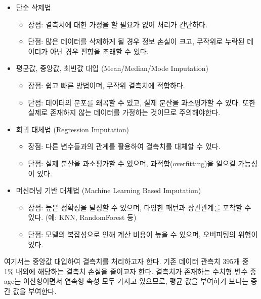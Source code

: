 \documentclass[
  letterpaper,
  DIV=11,
  numbers=noendperiod]{scrreprt}
\providecommand{\tightlist}{%
  \setlength{\itemsep}{0pt}\setlength{\parskip}{0pt}}\usepackage{longtable,booktabs,array}
\begin{document}
\begin{itemize}
\tightlist
\item
  단순 삭제법

  \begin{itemize}
  \tightlist
  \item
    장점: 결측치에 대한 가정을 할 필요가 없어 처리가 간단하다.
  \item
    단점: 많은 데이터를 삭제하게 될 경우 정보 손실이 크고, 무작위로
    누락된 데이터가 아닌 경우 편향을 초래할 수 있다.
  \end{itemize}
\item
  평균값, 중앙값, 최빈값 대입 (Mean/Median/Mode Imputation)

  \begin{itemize}
  \tightlist
  \item
    장점: 쉽고 빠른 방법이며, 무작위 결측치에 적합하다.
  \item
    단점: 데이터의 분포를 왜곡할 수 있고, 실제 분산을 과소평가할 수
    있다. 또한 실제로 존재하지 않는 데이터를 가정하는 것이므로
    주의해야한다.
  \end{itemize}
\item
  회귀 대체법 (Regression Imputation)

  \begin{itemize}
  \tightlist
  \item
    장점: 다른 변수들과의 관계를 활용하여 결측치를 대체할 수 있다.
  \item
    단점: 실제 분산을 과소평가할 수 있으며, 과적합(overfitting)을 일으킬
    가능성이 있다.
  \end{itemize}
\item
  머신러닝 기반 대체법 (Machine Learning Based Imputation)

  \begin{itemize}
  \tightlist
  \item
    장점: 높은 정확성을 달성할 수 있으며, 다양한 패턴과 상관관계를
    포착할 수 있다. (예: KNN, RandomForest 등)
  \item
    단점: 모델의 복잡성으로 인해 계산 비용이 높을 수 있으며, 오버피팅의
    위험이 있다.
  \end{itemize}
\end{itemize}

여기서는 중앙값 대입하여 결측치를 처리하고자 한다. 기존 데이터 관측치
395개 중 1\% 내외에 해당하는 결측치 손실을 줄이고자 한다. 결측치가
존재하는 수치형 변수 중 age는 이산형이면서 연속형 속성 모두 가지고
있으므로, 평균 값을 부여하기 보다는 중간 값을 부여한다.
\end{document}
